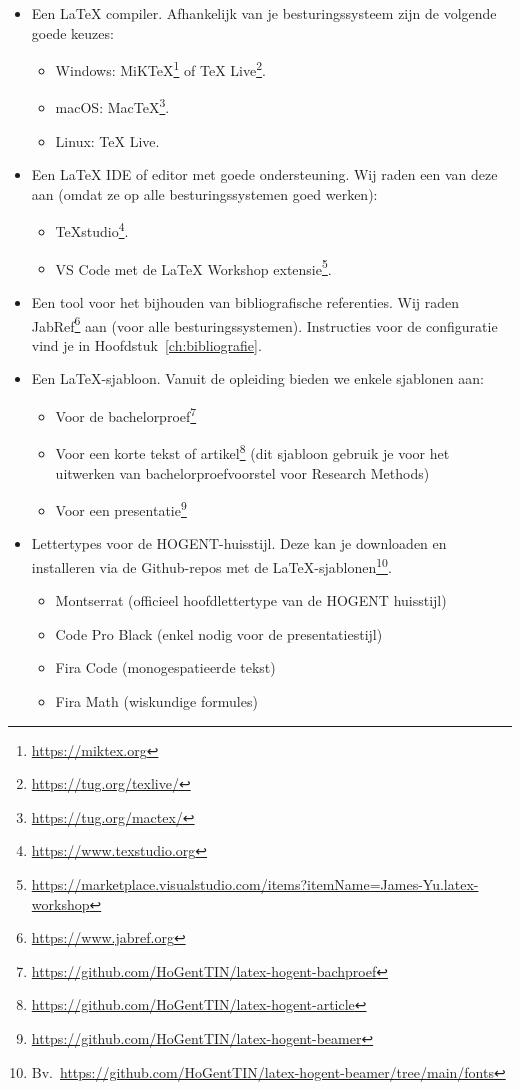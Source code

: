 \begin{itemize}
  \item Een {\LaTeX} compiler. Afhankelijk van je besturingssysteem zijn de volgende goede keuzes:
  \begin{itemize}
    \item Windows: MiKTeX\footnote{\url{https://miktex.org}} of TeX Live\footnote{\url{https://tug.org/texlive/}}.
    \item macOS: MacTeX\footnote{\url{https://tug.org/mactex/}}.
    \item Linux: TeX Live.
  \end{itemize}
  \item Een {\LaTeX} IDE of editor met goede ondersteuning. Wij raden een van deze aan (omdat ze op alle besturingssystemen goed werken):
  \begin{itemize}
    \item TeXstudio\footnote{\url{https://www.texstudio.org}}.
    \item VS Code met de LaTeX Workshop extensie\footnote{\url{https://marketplace.visualstudio.com/items?itemName=James-Yu.latex-workshop}}.
  \end{itemize}
  \item Een tool voor het bijhouden van bibliografische referenties. Wij raden JabRef\footnote{\url{https://www.jabref.org}} aan (voor alle besturingssystemen). Instructies voor de configuratie vind je in Hoofdstuk~\ref{ch:bibliografie}.
  \item Een {\LaTeX}-sjabloon. Vanuit de opleiding bieden we enkele sjablonen aan:
  \begin{itemize}
    \item Voor de bachelorproef\footnote{\url{https://github.com/HoGentTIN/latex-hogent-bachproef}}
    \item Voor een korte tekst of artikel\footnote{\url{https://github.com/HoGentTIN/latex-hogent-article}} (dit sjabloon gebruik je voor het uitwerken van bachelorproefvoorstel voor Research Methods)
    \item Voor een presentatie\footnote{\url{https://github.com/HoGentTIN/latex-hogent-beamer}}
  \end{itemize}
  \item Lettertypes voor de HOGENT-huisstijl. Deze kan je downloaden en installeren via de Github-repos met de {\LaTeX}-sjablonen\footnote{Bv.\ \url{https://github.com/HoGentTIN/latex-hogent-beamer/tree/main/fonts}}.
  \begin{itemize}
    \item Montserrat (officieel hoofdlettertype van de HOGENT huisstijl)
    \item Code Pro Black (enkel nodig voor de presentatiestijl)
    \item Fira Code (monogespatieerde tekst)
    \item Fira Math (wiskundige formules)
  \end{itemize}
\end{itemize}

